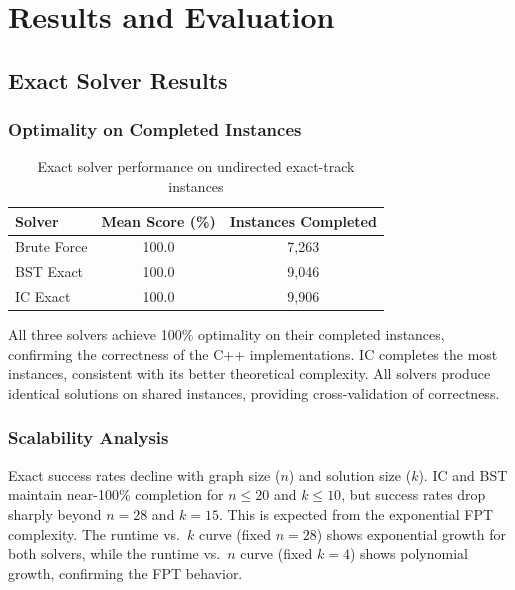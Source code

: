 \documentclass[10pt,a4paper]{report}
\theoremstyle{definition}
\begin{document}
\chapter{Results and Evaluation}
\label{ch:results}

\section{Exact Solver Results}

\subsection{Optimality on Completed Instances}

\begin{table}[H]
	\centering
	\caption{Exact solver performance on undirected exact-track instances}
	\label{tab:exact_results}
	\begin{tabular}{lcc}
		\toprule
		\textbf{Solver} & \textbf{Mean Score (\%)} & \textbf{Instances Completed} \\
		\midrule
		Brute Force     & 100.0                    & 7,263                        \\
		BST Exact       & 100.0                    & 9,046                        \\
		IC Exact        & 100.0                    & 9,906                        \\
		\bottomrule
	\end{tabular}
\end{table}

All three solvers achieve 100\% optimality on their completed instances, confirming the correctness of the C++ implementations. IC completes the most instances, consistent with its better theoretical complexity. All solvers produce identical solutions on shared instances, providing cross-validation of correctness.

\subsection{Scalability Analysis}

Exact success rates decline with graph size ($n$) and solution size ($k$). IC and BST maintain near-100\% completion for $n \leq 20$ and $k \leq 10$, but success rates drop sharply beyond $n = 28$ and $k = 15$. This is expected from the exponential FPT complexity. The runtime vs.\ $k$ curve (fixed $n = 28$) shows exponential growth for both solvers, while the runtime vs.\ $n$ curve (fixed $k = 4$) shows polynomial growth, confirming the FPT behavior.
\end{document}
